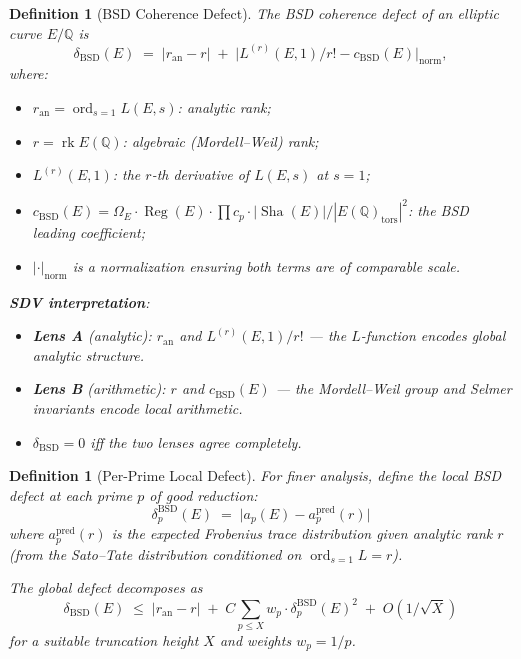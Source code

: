 \documentclass[11pt]{article}
\newtheorem{definition}[lemma]{Definition}
\theoremstyle{definition}
\DeclareMathOperator{\rk}{rk}
\DeclareMathOperator{\ord}{ord}
\DeclareMathOperator{\Reg}{Reg}
\DeclareMathOperator{\Sha}{Sha}
\begin{document}
\begin{definition}[BSD Coherence Defect]
\label{def:delta-BSD}
The \emph{BSD coherence defect} of an elliptic curve $E/\mathbb{Q}$ is
\[
  \delta_{\mathrm{BSD}}(E) \;=\;
  |r_{\mathrm{an}} - r| \;+\;
  \bigl| L^{(r)}(E, 1) / r! - c_{\mathrm{BSD}}(E) \bigr|_{\mathrm{norm}},
\]
where:
\begin{itemize}
  \item $r_{\mathrm{an}} = \ord_{s=1} L(E,s)$: analytic rank;
  \item $r = \rk E(\mathbb{Q})$: algebraic (Mordell--Weil) rank;
  \item $L^{(r)}(E, 1)$: the $r$-th derivative of $L(E,s)$ at $s = 1$;
  \item $c_{\mathrm{BSD}}(E) = \Omega_E \cdot \Reg(E) \cdot \prod c_p \cdot |\Sha(E)| / |E(\mathbb{Q})_{\mathrm{tors}}|^2$:
    the BSD leading coefficient;
  \item $|\cdot|_{\mathrm{norm}}$ is a normalization ensuring both terms are of comparable scale.
\end{itemize}

\textbf{SDV interpretation}:
\begin{itemize}
  \item \textbf{Lens A} (analytic): $r_{\mathrm{an}}$ and $L^{(r)}(E,1)/r!$
    --- the $L$-function encodes global analytic structure.
  \item \textbf{Lens B} (arithmetic): $r$ and $c_{\mathrm{BSD}}(E)$
    --- the Mordell--Weil group and Selmer invariants encode local arithmetic.
  \item $\delta_{\mathrm{BSD}} = 0$ iff the two lenses agree completely.
\end{itemize}
\end{definition}

\begin{definition}[Per-Prime Local Defect]
\label{def:local-bsd-defect}
For finer analysis, define the local BSD defect at each prime $p$ of good reduction:
\[
  \delta_p^{\mathrm{BSD}}(E) \;=\; \bigl| a_p(E) - a_p^{\mathrm{pred}}(r) \bigr|
\]
where $a_p^{\mathrm{pred}}(r)$ is the expected Frobenius trace distribution given
analytic rank $r$ (from the Sato--Tate distribution conditioned on $\ord_{s=1} L = r$).

The global defect decomposes as
\[
  \delta_{\mathrm{BSD}}(E) \;\leq\; |r_{\mathrm{an}} - r| \;+\; C \sum_{p \leq X} w_p \cdot \delta_p^{\mathrm{BSD}}(E)^2
  \;+\; O(1/\sqrt{X})
\]
for a suitable truncation height $X$ and weights $w_p = 1/p$.
\end{definition}
\end{document}
